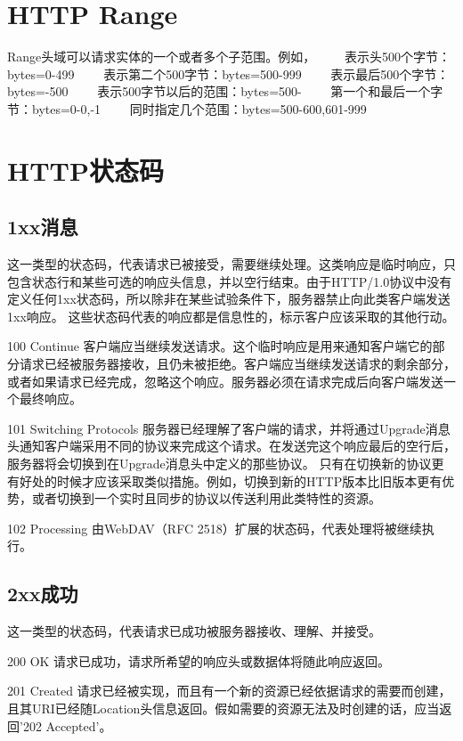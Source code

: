 \section{HTTP Range}
Range头域可以请求实体的一个或者多个子范围。例如，  
　　表示头500个字节：bytes=0-499  
　　表示第二个500字节：bytes=500-999  
　　表示最后500个字节：bytes=-500  
　　表示500字节以后的范围：bytes=500-  
　　第一个和最后一个字节：bytes=0-0,-1  
　　同时指定几个范围：bytes=500-600,601-999 

\section{HTTP状态码}

\subsection{1xx消息}
这一类型的状态码，代表请求已被接受，需要继续处理。这类响应是临时响应，只包含状态行和某些可选的响应头信息，并以空行结束。由于HTTP/1.0协议中没有定义任何1xx状态码，所以除非在某些试验条件下，服务器禁止向此类客户端发送1xx响应。 这些状态码代表的响应都是信息性的，标示客户应该采取的其他行动。

100 Continue
客户端应当继续发送请求。这个临时响应是用来通知客户端它的部分请求已经被服务器接收，且仍未被拒绝。客户端应当继续发送请求的剩余部分，或者如果请求已经完成，忽略这个响应。服务器必须在请求完成后向客户端发送一个最终响应。

101 Switching Protocols
服务器已经理解了客户端的请求，并将通过Upgrade消息头通知客户端采用不同的协议来完成这个请求。在发送完这个响应最后的空行后，服务器将会切换到在Upgrade消息头中定义的那些协议。
只有在切换新的协议更有好处的时候才应该采取类似措施。例如，切换到新的HTTP版本比旧版本更有优势，或者切换到一个实时且同步的协议以传送利用此类特性的资源。

102 Processing
由WebDAV（RFC 2518）扩展的状态码，代表处理将被继续执行。

\subsection{2xx成功}

这一类型的状态码，代表请求已成功被服务器接收、理解、并接受。

200 OK
请求已成功，请求所希望的响应头或数据体将随此响应返回。

201 Created
请求已经被实现，而且有一个新的资源已经依据请求的需要而创建，且其URI已经随Location头信息返回。假如需要的资源无法及时创建的话，应当返回'202 Accepted'。

